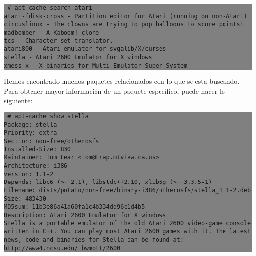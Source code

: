 \documentclass[12pt]{article}
\begin{document}
\colorbox{grey}{\parbox[t]{0.95\linewidth}{ \vspace*{0.5cm} {\tt
     \# apt-cache search atari\\
     atari-fdisk-cross - Partition editor for Atari (running on non-Atari)\\
     circuslinux - The clowns are trying to pop balloons to score points!\\
     madbomber - A Kaboom! clone\\
     tcs - Character set translator.\\
     atari800 - Atari emulator for svgalib/X/curses\\
     stella - Atari 2600 Emulator for X windows\\
     xmess-x - X binaries for Multi-Emulator Super System\\
 } \vspace*{0.5cm} } } 

Hemos encontrado muchos paquetes relacionados con lo que se esta buscando. Para obtener mayor información de un paquete específico, puede hacer lo siguiente:

\colorbox{grey}{\parbox[t]{0.95\linewidth}{ \vspace*{0.5cm} {\tt
     \# apt-cache show stella\\
     Package: stella\\
     Priority: extra\\
     Section: non-free/otherosfs\\
     Installed-Size: 830\\
     Maintainer: Tom Lear <tom@trap.mtview.ca.us>\\
     Architecture: i386\\
     version: 1.1-2\\
     Depends: libc6 (>= 2.1), libstdc++2.10, xlib6g (>= 3.3.5-1)\\
     Filename: dists/potato/non-free/binary-i386/otherosfs/stella\_1.1-2.deb\\
     Size: 483430\\
     MD5sum: 11b3e86a41a60fa1c4b334dd96c1d4b5\\
     Description: Atari 2600 Emulator for X windows\\
      Stella is a portable emulator of the old Atari 2600 video-game console\\
      written in C++. You can play most Atari 2600 games with it. The latest\\
      news, code and binaries for Stella can be found at:\\
      http://www4.ncsu.edu/~bwmott/2600\\
 } \vspace*{0.5cm} } } 
\end{document}
